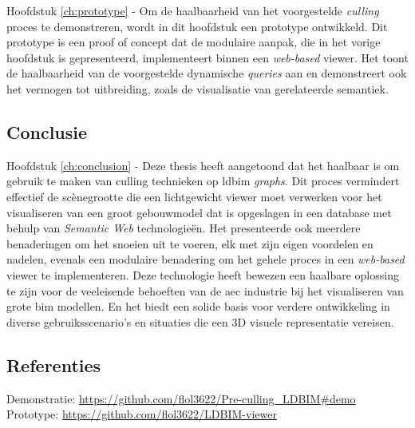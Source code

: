 \begin{refsection}
\begin{multicols}{2}
        \textsf{Hoofdstuk \ref{ch:prototype} -}
        Om de haalbaarheid van het voorgestelde \emph{culling} proces te demonstreren, wordt in dit hoofdstuk een prototype ontwikkeld. Dit prototype is een proof of concept dat de modulaire aanpak, die in het vorige hoofdstuk is gepresenteerd, implementeert binnen een \emph{web-based} viewer. Het toont de haalbaarheid van de voorgestelde dynamische \emph{queries} aan en demonstreert ook het vermogen tot uitbreiding, zoals de visualisatie van gerelateerde semantiek.

        \subsection*{Conclusie}
        \textsf{Hoofdstuk \ref{ch:conclusion} -} Deze thesis heeft aangetoond dat het haalbaar is om gebruik te maken van culling technieken op \ac{ldbim} \emph{graphs}. Dit proces vermindert effectief de scènegrootte die een lichtgewicht viewer moet verwerken voor het visualiseren van een groot gebouwmodel dat is opgeslagen in een database met behulp van \emph{Semantic Web} technologieën. Het presenteerde ook meerdere benaderingen om het snoeien uit te voeren, elk met zijn eigen voordelen en nadelen, evenals een modulaire benadering om het gehele proces in een \emph{web-based} viewer te implementeren. Deze technologie heeft bewezen een haalbare oplossing te zijn voor de veeleisende behoeften van de \ac{aec} industrie bij het visualiseren van grote \ac{bim} modellen. En het biedt een solide basis voor verdere ontwikkeling in diverse gebruiksscenario's en situaties die een 3D visuele representatie vereisen.

    \end{multicols}
    \subsection*{Referenties}
    \small
    {\renewcommand*{\bibfont}{\small}
        \printbibliography}

    \textsf{Demonstratie:} \url{https://github.com/flol3622/Pre-culling_LDBIM#demo}\\
    \textsf{Prototype:} \url{https://github.com/flol3622/LDBIM-viewer}
\end{refsection}